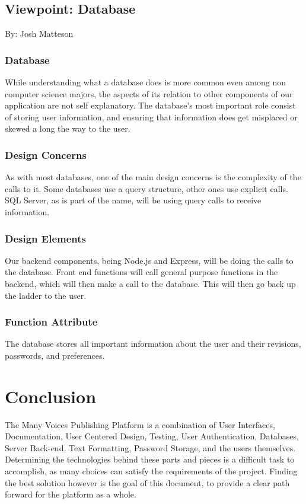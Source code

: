 \documentclass[onecolumn, draftclsnofoot,10pt, compsoc]{IEEEtran}
\begin{document}
\newpage

\subsection{Viewpoint: Database}
{\noindent By: Josh Matteson \par}

\subsubsection{Database}
\noindent While understanding what a database does is more common even 
among non computer science majors, the aspects of its relation
to other components of our application are not self explanatory. 
The database's most important role consist of storing user information,
and ensuring that information does get misplaced or skewed a long the way 
to the user. \\

\subsubsection{Design Concerns}
\noindent As with most databases, one of the main design concerns is 
the complexity of the calls to it. Some databases use a query structure,
other ones use explicit calls. SQL Server, as is part of the name, 
will be using query calls to receive information. \\

\subsubsection{Design Elements}
\noindent Our backend components, being Node.js and Express, will be doing 
the calls to the database. Front end functions will call general purpose
functions in the backend, which will then make a call to the database. This 
will then go back up the ladder to the user. \\

\subsubsection{Function Attribute}
\noindent The database stores all important information about the user 
and their revisions, passwords, and preferences. \\


\section{Conclusion}
{\noindent  The Many Voices Publishing Platform is a combination of User Interfaces, Documentation, User Centered Design, Testing, User Authentication, Databases, Server Back-end, Text Formatting, Password Storage, and the users themselves. Determining the technologies behind these parts and pieces is a difficult task to accomplish, as many choices can satisfy the requirements of the project. Finding the best solution however is the goal of this document, to provide a clear path forward for the platform as a whole. \par}
\end{document}
